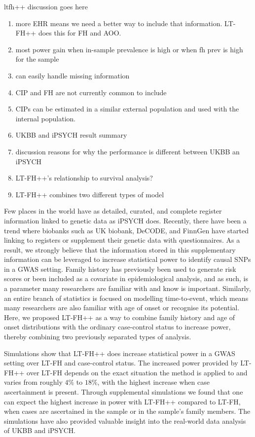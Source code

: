 ltfh++ discussion goes here

\begin{enumerate}
	\item more EHR means we need a better way to include that information. LT-FH++ does this for FH and AOO.
	\item most power gain when in-sample prevalence is high or when fh prev is high for the sample
	\item can easily handle missing information
	\item CIP and FH are not currently common to include
	\item CIPs can be estimated in a similar external population and used with the internal population.
	\item UKBB and iPSYCH result summary
	\item discussion reasons for why the performance is different between UKBB an iPSYCH
	\item LT-FH++'s relationship to survival analysis?
	\item LT-FH++ combines two different types of model
\end{enumerate}


Few places in the world have as detailed, curated, and complete register information linked to genetic data as iPSYCH does. Recently, there have been a trend where biobanks such as UK biobank, DeCODE, and FinnGen have started linking to registers or supplement their genetic data with questionnaires. As a result, we strongly believe that the information stored in this supplementary information can be leveraged to increase statistical power to identify causal SNPs in a GWAS setting. Family history has previously been used to generate risk scores or been included as a covariate in epidemiological analysis, and as such, is a parameter many researchers are familiar with and know is important. Similarly, an entire branch of statistics is focused on modelling time-to-event, which means many researchers are also familiar with age of onset or recognise its potential. Here, we proposed LT-FH++ as a way to combine family history and age of onset distributions with the ordinary case-control status to increase power, thereby combining two previously separated types of analysis.

Simulations show that LT-FH++ does increase statistical power in a GWAS setting over LT-FH and case-control status. The increased power provided by LT-FH++ over LT-FH depends on the exact situation the method is applied to and varies from roughly $ 4\% $ to $ 18\% $, with the highest increase when case ascertainment is present. Through supplemental simulations we found that one can expect the highest increase in power with LT-FH++ compared to LT-FH, when cases are ascertained in the sample or in the sample's family members. The simulations have also provided valuable insight into the real-world data analysis of UKBB and iPSYCH.


